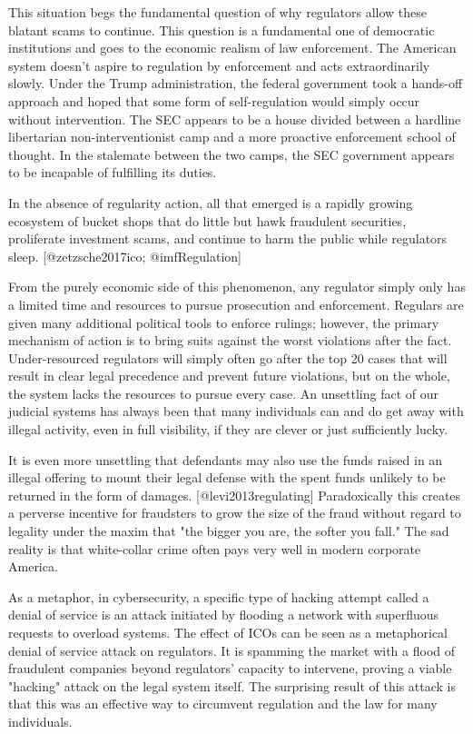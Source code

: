 This situation begs the fundamental question of why regulators allow these
blatant scams to continue. This question is a fundamental one of democratic
institutions and goes to the economic realism of law enforcement. The American
system doesn't aspire to regulation by enforcement and acts extraordinarily
slowly. Under the Trump administration, the federal government took a hands-off
approach and hoped that some form of self-regulation would simply occur without
intervention. The SEC appears to be a house divided between a hardline
libertarian non-interventionist camp and a more proactive enforcement school of
thought. In the stalemate between the two camps, the SEC government appears to
be incapable of fulfilling its duties.

In the absence of regularity action, all that emerged is a rapidly growing
ecosystem of bucket shops that do little but hawk fraudulent securities,
proliferate investment scams, and continue to harm the public while regulators
sleep. [@zetzsche2017ico; @imfRegulation]
\cite{zetzsche2017ico, imfRegulation}


From the purely economic side of this phenomenon, any regulator simply only has
a limited time and resources to pursue prosecution and enforcement. Regulars are
given many additional political tools to enforce rulings; however, the primary
mechanism of action is to bring suits against the worst violations after the
fact. Under-resourced regulators will simply often go after the top 20%
cases that will result in clear legal precedence and prevent future violations,
but on the whole, the system lacks the resources to pursue every case. An
unsettling fact of our judicial systems has always been that many individuals
can and do get away with illegal activity, even in full visibility, if they are
clever or just sufficiently lucky.

It is even more unsettling that defendants may also use the funds raised in an
illegal offering to mount their legal defense with the spent funds unlikely to
be returned in the form of damages. [@levi2013regulating] Paradoxically this
creates a perverse incentive for fraudsters to grow the size of the fraud
without regard to legality under the maxim that "the bigger you are, the softer
you fall." The sad reality is that white-collar crime often pays very well in
modern corporate America.

As a metaphor, in cybersecurity, a specific type of hacking attempt called a
denial of service is an attack initiated by flooding a network with superfluous
requests to overload systems. The effect of ICOs can be seen as a metaphorical
denial of service attack on regulators. It is spamming the market with a flood
of fraudulent companies beyond regulators' capacity to intervene, proving a
viable "hacking" attack on the legal system itself. The surprising result of
this attack is that this was an effective way to circumvent regulation and the
law for many individuals.

